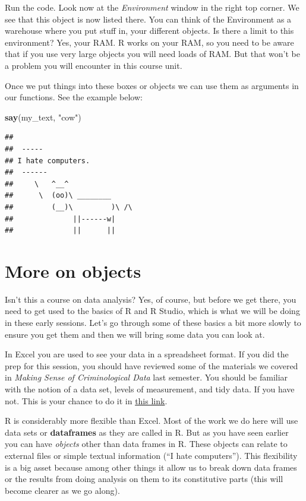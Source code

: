 \documentclass[]{book}
\newenvironment{Shaded}{\begin{snugshade}}{\end{snugshade}}
\newcommand{\KeywordTok}[1]{\textcolor[rgb]{0.13,0.29,0.53}{\textbf{#1}}}
\newcommand{\NormalTok}[1]{#1}
\newcommand{\StringTok}[1]{\textcolor[rgb]{0.31,0.60,0.02}{#1}}
\begin{document}
Run the code. Look now at the \emph{Environment} window in the right top corner. We see that this object is now listed there. You can think of the Environment as a warehouse where you put stuff in, your different objects. Is there a limit to this environment? Yes, your RAM. R works on your RAM, so you need to be aware that if you use very large objects you will need loads of RAM. But that won't be a problem you will encounter in this course unit.

Once we put things into these boxes or objects we can use them as arguments in our functions. See the example below:

\begin{Shaded}
\begin{Highlighting}[]
\KeywordTok{say}\NormalTok{(my_text, }\StringTok{"cow"}\NormalTok{)}
\end{Highlighting}
\end{Shaded}

\begin{verbatim}
## 
##  ----- 
## I hate computers. 
##  ------ 
##     \   ^__^ 
##      \  (oo)\ ________ 
##         (__)\         )\ /\ 
##              ||------w|
##              ||      ||
\end{verbatim}

\hypertarget{more-on-objects}{%
\section{More on objects}\label{more-on-objects}}

Isn't this a course on data analysis? Yes, of course, but before we get there, you need to get used to the basics of R and R Studio, which is what we will be doing in these early sessions. Let's go through some of these basics a bit more slowly to ensure you get them and then we will bring some data you can look at.

In Excel you are used to see your data in a spreadsheet format. If you did the prep for this session, you should have reviewed some of the materials we covered in \emph{Making Sense of Criminological Data} last semester. You should be familiar with the notion of a data set, levels of measurement, and tidy data. If you have not. This is your chance to do it in \href{https://rawgit.com/maczokni/MSCD/master/book/bookdown-demo-master/bookdown-demo-master/docs/week1.html\#data-variables-and-observations}{this link}.

R is considerably more flexible than Excel. Most of the work we do here will use data sets or \textbf{dataframes} as they are called in R. But as you have seen earlier you can have \emph{objects} other than data frames in R. These objects can relate to external files or simple textual information (``I hate computers''). This flexibility is a big asset because among other things it allow us to break down data frames or the results from doing analysis on them to its constitutive parts (this will become clearer as we go along).
\end{document}
